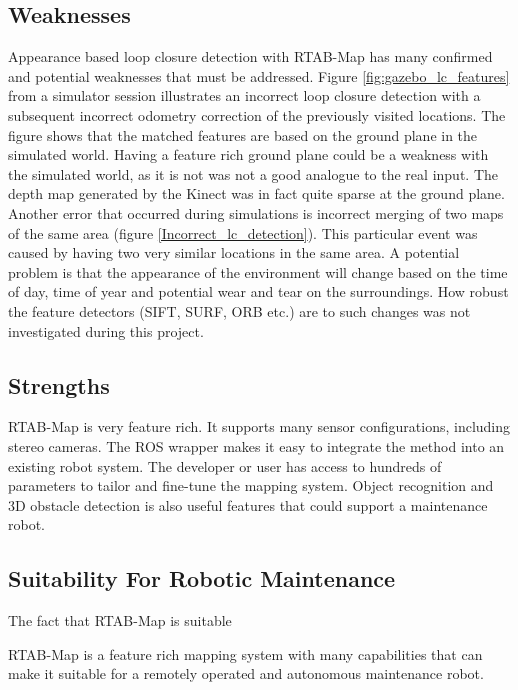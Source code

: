 \subsection{Weaknesses}

Appearance based loop closure detection with \ac{RTAB-Map} has many confirmed and potential weaknesses that must be addressed. Figure \ref{fig:gazebo_lc_features} from a simulator session illustrates an incorrect loop closure detection with a subsequent incorrect odometry correction of the previously visited locations. The figure shows that the matched features are based on the ground plane in the simulated world. Having a feature rich ground plane could be a weakness with the simulated world, as it is not was not a good analogue to the real input. The depth map generated by the Kinect was in fact quite sparse at the ground plane. Another error that occurred during simulations is incorrect merging of two maps of the same area (figure \ref{Incorrect_lc_detection}). This particular event was caused by having two very similar locations in the same area. A potential problem is that the appearance of the environment will change based on the time of day, time of year and potential wear and tear on the surroundings. How robust the feature detectors (\ac{SIFT}, \ac{SURF}, \ac{ORB} etc.) are to such changes was not investigated during this project.

\subsection{Strengths}

\ac{RTAB-Map} is very feature rich. It supports many sensor configurations, including stereo cameras. The \ac{ROS} wrapper makes it easy to integrate the method into an existing robot system. The developer or user has access to hundreds of parameters to tailor and fine-tune the mapping system. Object recognition and 3D obstacle detection is also useful features that could support a maintenance robot.


\subsection{Suitability For Robotic Maintenance}

The fact that \ac{RTAB-Map} is suitable

\ac{RTAB-Map} is a feature rich mapping system with many capabilities that can make it suitable for a remotely operated and autonomous maintenance robot. 

